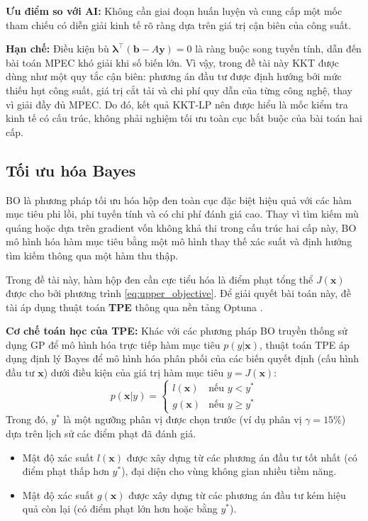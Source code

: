 \textbf{Ưu điểm so với AI:} Không cần giai đoạn huấn luyện và cung cấp một mốc tham chiếu có diễn giải kinh tế rõ ràng dựa trên giá trị cận biên của công suất.

\textbf{Hạn chế:} Điều kiện bù $\boldsymbol{\lambda}^\top(\mathbf{b} - A\mathbf{y}) = 0$ là ràng buộc song tuyến tính, dẫn đến bài toán MPEC khó giải khi số biến lớn. Vì vậy, trong đề tài này KKT được dùng như một quy tắc cận biên: phương án đầu tư được định hướng bởi mức thiếu hụt công suất, giá trị cắt tải và chi phí quy dẫn của từng công nghệ, thay vì giải đầy đủ MPEC. Do đó, kết quả KKT-LP nên được hiểu là mốc kiểm tra kinh tế có cấu trúc, không phải nghiệm tối ưu toàn cục bắt buộc của bài toán hai cấp.

\subsection{Tối ưu hóa Bayes}
BO là phương pháp tối ưu hóa hộp đen toàn cục đặc biệt hiệu quả với các hàm mục tiêu phi lồi, phi tuyến tính và có chi phí đánh giá cao. Thay vì tìm kiếm mù quáng hoặc dựa trên gradient vốn không khả thi trong cấu trúc hai cấp này, BO mô hình hóa hàm mục tiêu bằng một mô hình thay thế xác suất và định hướng tìm kiếm thông qua một hàm thu thập.

Trong đề tài này, hàm hộp đen cần cực tiểu hóa là điểm phạt tổng thể $J(\mathbf{x})$ được cho bởi phương trình \eqref{eq:upper_objective}. Để giải quyết bài toán này, đề tài áp dụng thuật toán \textbf{TPE} \cite{bergstra2011tpe} thông qua nền tảng Optuna \cite{akiba2019optuna}.

\textbf{Cơ chế toán học của TPE:}
Khác với các phương pháp BO truyền thống sử dụng GP để mô hình hóa trực tiếp hàm mục tiêu $p(y|\mathbf{x})$, thuật toán TPE áp dụng định lý Bayes để mô hình hóa phân phối của các biến quyết định (cấu hình đầu tư $\mathbf{x}$) dưới điều kiện của giá trị hàm mục tiêu $y = J(\mathbf{x})$:
\begin{equation}
    p(\mathbf{x}|y) = \begin{cases} 
        l(\mathbf{x}) & \text{nếu } y < y^* \\ 
        g(\mathbf{x}) & \text{nếu } y \geq y^* 
    \end{cases}
    \label{eq:tpe_bayes}
\end{equation}
Trong đó, $y^*$ là một ngưỡng phân vị được chọn trước (ví dụ phân vị $\gamma = 15\%$) dựa trên lịch sử các điểm phạt đã đánh giá. 
\begin{itemize}
    \item Mật độ xác suất $l(\mathbf{x})$ được xây dựng từ các phương án đầu tư tốt nhất (có điểm phạt thấp hơn $y^*$), đại diện cho vùng không gian nhiều tiềm năng.
    \item Mật độ xác suất $g(\mathbf{x})$ được xây dựng từ các phương án đầu tư kém hiệu quả còn lại (có điểm phạt lớn hơn hoặc bằng $y^*$).
\end{itemize}

